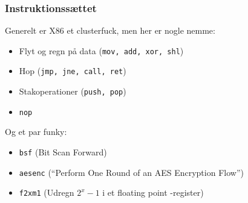 \documentclass[slidestop,compress,mathserif, xcolor=table]{beamer}
\begin{document}
\begin{frame}[c]
    \frametitle{Instruktionssættet}

    Generelt er X86 et clusterfuck, men her er nogle nemme:
    \begin{itemize}
        \pause\item Flyt og regn på data (\texttt{mov, add, xor, shl})
        \pause\item Hop (\texttt{jmp, jne, call, ret})
        \pause\item Stakoperationer (\texttt{push, pop})
        \pause\item \texttt{nop}
    \end{itemize}\vskip15pt

    \pause Og et par funky:
    \begin{itemize}
        \pause
      \item \texttt{bsf} (Bit Scan Forward)

        \pause
      \item \texttt{aesenc} (``Perform One Round of an AES Encryption Flow'')

        \pause
      \item \texttt{f2xm1} (Udregn $2^x-1$ i et floating point -register)
    \end{itemize}
\end{frame}
\end{document}
